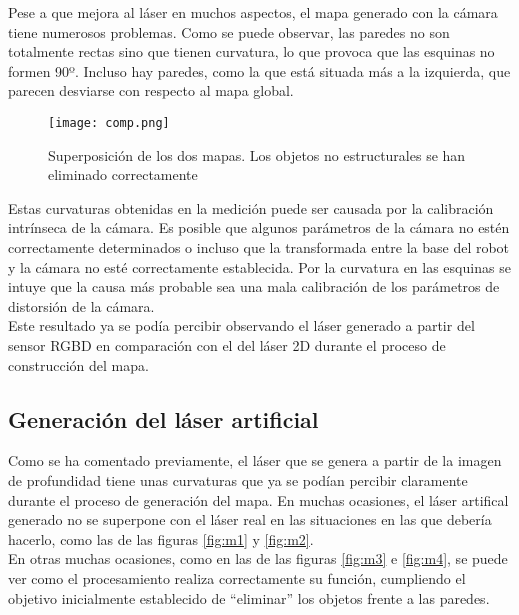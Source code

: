 Pese a que mejora al láser en muchos aspectos, el mapa generado con la cámara tiene numerosos problemas. Como se puede observar, las paredes no son totalmente rectas sino que tienen curvatura, lo que provoca que las esquinas no formen 90º. Incluso hay paredes, como la que está situada más a la izquierda, que parecen desviarse con respecto al mapa global.\\

\begin{figure}[h]
	\begin{center} 
		\texttt{[image: comp.png]}
	\end{center}
	\caption{Superposición de los dos mapas. Los objetos no estructurales se han eliminado correctamente}
	\label{fig:comp}
\end{figure}

Estas curvaturas obtenidas en la medición puede ser causada por la calibración intrínseca de la cámara. Es posible que algunos parámetros de la cámara no estén correctamente determinados o incluso que la transformada entre la base del robot y la cámara no esté correctamente establecida. Por la curvatura en las esquinas se intuye que la causa más probable sea una mala calibración de los parámetros de distorsión de la cámara.\\

Este resultado ya se podía percibir observando el láser generado a partir del sensor RGBD en comparación con el del láser 2D durante el proceso de construcción del mapa.\\

\subsection{Generación del láser artificial}

Como se ha comentado previamente, el láser que se genera a partir de la imagen de profundidad tiene unas curvaturas que ya se podían percibir claramente durante el proceso de generación del mapa. En muchas ocasiones, el láser artifical generado no se superpone con el láser real en las situaciones en las que debería hacerlo, como las de las figuras \ref{fig:m1} y \ref{fig:m2}.\\

En otras muchas ocasiones, como en las de las figuras \ref{fig:m3} e \ref{fig:m4}, se puede ver como el procesamiento realiza correctamente su función, cumpliendo el objetivo inicialmente establecido de ``eliminar'' los objetos frente a las paredes.\\

